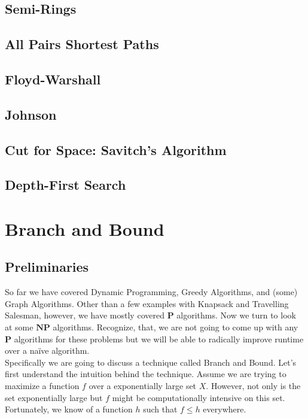 \documentclass[10pt]{article}
\theoremstyle{plain}
\theoremstyle{definition}
\numberwithin{equation}{section}
\numberwithin{figure}{section}
\begin{document}
\subsection{Semi-Rings}

\subsection{All Pairs Shortest Paths}

\subsection{Floyd-Warshall}

\subsection{Johnson}

\subsection{Cut for Space: Savitch's Algorithm}

\subsection{Depth-First Search}


\newpage
\section{Branch and Bound}

\subsection{Preliminaries}
So far we have covered Dynamic Programming, Greedy Algorithms, and (some) Graph Algorithms. Other than a few examples with Knapsack and Travelling Salesman, however, we have mostly covered $\textbf{P}$ algorithms. Now we turn to look at some $\textbf{NP}$ algorithms. Recognize, that, we are not going to come up with any $\textbf{P}$ algorithms for these problems but we will be able to radically improve runtime over a na\"ive algorithm. \\

\noindent Specifically we are going to discuss a technique called Branch and Bound. Let's first understand the intuition behind the technique. Assume we are trying to maximize a function $f$ over a exponentially large set $X$. However, not only is the set exponentially large but $f$ might be computationally intensive on this set. Fortunately, we know of a function $h$ such that $f \leq h$ everywhere. \\
\end{document}
